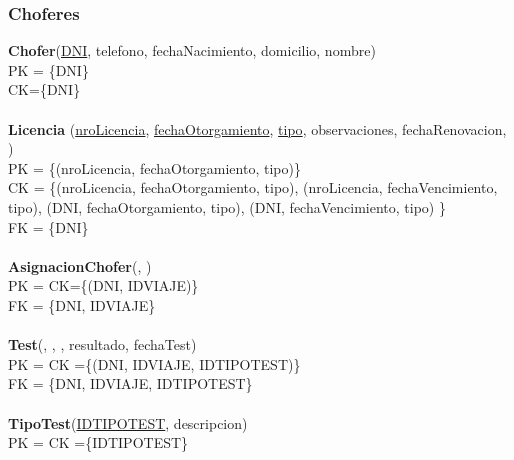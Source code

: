\subsubsection{Choferes}
\textbf{Chofer}(\underline{DNI}, telefono, fechaNacimiento, domicilio, nombre) \\
PK = \{DNI\} \\
CK=\{DNI\} \\
\\
\textbf{Licencia} (\underline{nroLicencia}, \underline{fechaOtorgamiento}, \underline{tipo},
observaciones, fechaRenovacion, ) \\
PK = \{(nroLicencia, fechaOtorgamiento, tipo)\} \\
CK = \{(nroLicencia, fechaOtorgamiento, tipo), (nroLicencia, fechaVencimiento, tipo),
(DNI, fechaOtorgamiento, tipo), (DNI, fechaVencimiento, tipo) \} \\
FK = \{DNI\} \\
\\
\textbf{AsignacionChofer}(,
)
\\
PK = CK=\{(DNI, IDVIAJE)\}
\\
FK = \{DNI, IDVIAJE\}
\\
\\
\textbf{Test}(\underline{}, ,
, resultado, fechaTest) \\
PK = CK =\{(DNI, IDVIAJE, IDTIPOTEST)\} \\
FK = \{DNI, IDVIAJE, IDTIPOTEST\} \\
\\
\textbf{TipoTest}(\underline{IDTIPOTEST}, descripcion)
\\
PK = CK =\{IDTIPOTEST\}
